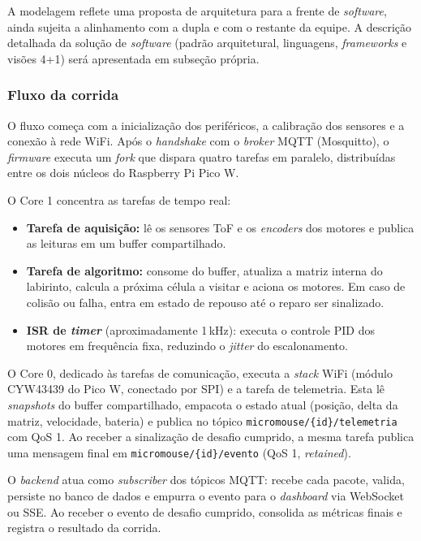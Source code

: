     A modelagem reflete uma proposta de arquitetura para a frente de \textit{software}, ainda sujeita a alinhamento com a dupla e com o restante da equipe. A descrição detalhada da solução de \textit{software} (padrão arquitetural, linguagens, \textit{frameworks} e visões 4+1) será apresentada em subseção própria.

    \subsubsection{Fluxo da corrida}

    O fluxo começa com a inicialização dos periféricos, a calibração dos sensores e a conexão à rede WiFi. Após o \textit{handshake} com o \textit{broker} MQTT (Mosquitto), o \textit{firmware} executa um \textit{fork} que dispara quatro tarefas em paralelo, distribuídas entre os dois núcleos do Raspberry Pi Pico W.

    O Core 1 concentra as tarefas de tempo real:

    \begin{itemize}
        \item \textbf{Tarefa de aquisição:} lê os sensores ToF e os \textit{encoders} dos motores e publica as leituras em um buffer compartilhado.
        \item \textbf{Tarefa de algoritmo:} consome do buffer, atualiza a matriz interna do labirinto, calcula a próxima célula a visitar e aciona os motores. Em caso de colisão ou falha, entra em estado de repouso até o reparo ser sinalizado.
        \item \textbf{ISR de \textit{timer}} (aproximadamente 1\,kHz): executa o controle PID dos motores em frequência fixa, reduzindo o \textit{jitter} do escalonamento.
    \end{itemize}

    O Core 0, dedicado às tarefas de comunicação, executa a \textit{stack} WiFi (módulo CYW43439 do Pico W, conectado por SPI) e a tarefa de telemetria. Esta lê \textit{snapshots} do buffer compartilhado, empacota o estado atual (posição, delta da matriz, velocidade, bateria) e publica no tópico \texttt{micromouse/\{id\}/telemetria} com QoS 1. Ao receber a sinalização de desafio cumprido, a mesma tarefa publica uma mensagem final em \texttt{micromouse/\{id\}/evento} (QoS 1, \textit{retained}).

    O \textit{backend} atua como \textit{subscriber} dos tópicos MQTT: recebe cada pacote, valida, persiste no banco de dados e empurra o evento para o \textit{dashboard} via WebSocket ou SSE. Ao receber o evento de desafio cumprido, consolida as métricas finais e registra o resultado da corrida.

